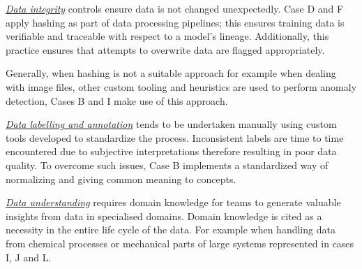 \underline{\emph{Data integrity}}
controls ensure data is not changed unexpectedly. Case D and F apply hashing as part of data processing pipelines; this ensures training data is verifiable and traceable with respect to a model's lineage. Additionally, this practice ensures that attempts to overwrite data are flagged appropriately.

Generally, when hashing is not a suitable approach for example when dealing with image files, other custom tooling and heuristics are used to perform anomaly detection, Cases B and I make use of this approach. %

% 


\underline{\emph{Data labelling and annotation}} tends to be undertaken manually using custom tools developed to standardize the process. %
Inconsistent labels are time to time encountered due to subjective interpretations therefore resulting in poor data quality. To overcome such issues, Case B implements a standardized way of normalizing and giving common meaning to concepts. %

\underline{\emph{Data understanding}} requires domain knowledge for teams to generate valuable insights from data in specialised domains. Domain knowledge is cited as a necessity in the entire life cycle of the data. For example when handling data from chemical processes or mechanical parts of large systems represented in cases I, J and L. %

